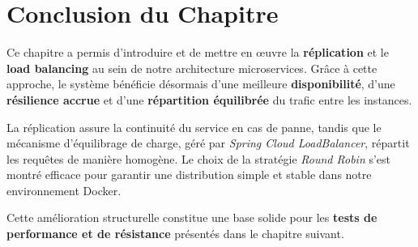\section*{Conclusion du Chapitre}
Ce chapitre a permis d'introduire et de mettre en œuvre la \textbf{réplication} et le \textbf{load balancing} au sein de notre architecture microservices.  
Grâce à cette approche, le système bénéficie désormais d'une meilleure \textbf{disponibilité}, d'une \textbf{résilience accrue} et d'une \textbf{répartition équilibrée} du trafic entre les instances.

La réplication assure la continuité du service en cas de panne, tandis que le mécanisme d'équilibrage de charge, géré par \textit{Spring Cloud LoadBalancer}, répartit les requêtes de manière homogène.  
Le choix de la stratégie \textit{Round Robin} s'est montré efficace pour garantir une distribution simple et stable dans notre environnement Docker.

Cette amélioration structurelle constitue une base solide pour les \textbf{tests de performance et de résistance} présentés dans le chapitre suivant.